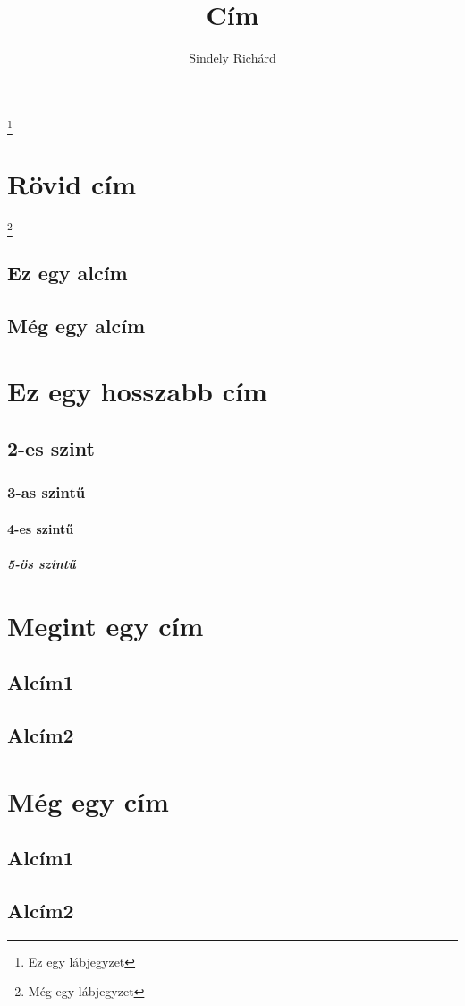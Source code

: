 \documentclass[twoside]{book}
\newenvironment{abstract}{}{}
\begin{document}
\title{Cím}
\author{Sindely Richárd}
\maketitle
\let\cleardoublepage\clearpage
\renewcommand{\thefootnote}{\fnsymbol{footnote}}
\begin{abstract}
\hulipsum[2]
\footnote{Ez egy lábjegyzet}
\end{abstract}
\setcounter{tocdepth}{5}
\tableofcontents
\clearpage
{}
\section{Rövid cím}
\setcounter{secnumdepth}{5}
\hulipsum[2]
\footnote{Még egy lábjegyzet}
\clearpage
\subsection{Ez egy alcím}
\hulipsum[3]
\clearpage
\subsection{Még egy alcím}
\hulipsum[3]
\section{Ez egy hosszabb cím}
\hulipsum[3]
\subsection{2-es szint}
\subsubsection{3-as szintű}
\paragraph{4-es szintű}
\subparagraph{5-ös szintű}
\appendix
\section{Megint egy cím}
\subsection{Alcím1}
\subsection{Alcím2}
\section{Még egy cím}
\subsection{Alcím1}
\subsection{Alcím2}
\end{document}
